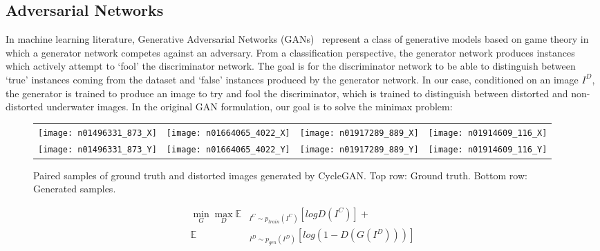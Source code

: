 \subsection{Adversarial Networks}
\label{sec:gans}
In machine learning literature, Generative Adversarial Networks 
(GANs)~\cite{goodfellow2014generative} represent a class of generative models based on game theory in which a generator network 
competes against an adversary. From a classification perspective, the generator network produces instances which actively attempt 
to `fool' the discriminator network. The goal is for the discriminator network to be able to distinguish between `true' 
instances coming from the dataset and `false' instances produced by the generator network.
In our case, conditioned on an image $I^D$, the generator is trained to produce an image to try and fool the 
discriminator, which is trained to distinguish between distorted and non-distorted underwater images. In the original
GAN formulation, our goal is to solve the minimax problem:

\begin{figure}
\centering
\begin{tabular}{p{1.7cm} p{1.7cm} p{1.7cm} p{1.7cm}}
   
   \texttt{[image: n01496331\_873\_X]} &
   \texttt{[image: n01664065\_4022\_X]} &
   \texttt{[image: n01917289\_889\_X]} &
   \texttt{[image: n01914609\_116\_X]} \\
   \texttt{[image: n01496331\_873\_Y]} &
   \texttt{[image: n01664065\_4022\_Y]} &
   \texttt{[image: n01917289\_889\_Y]} &
   \texttt{[image: n01914609\_116\_Y]} \\

\end{tabular}
\caption{Paired samples of ground truth and distorted images generated by CycleGAN. Top row: Ground truth.
Bottom row: Generated samples.}
\label{fig:cgan_samples}
\end{figure}


\begin{equation}
\begin{aligned}
   \min\limits_{G}\max\limits_{D} \mathbb{E} & _{I^C \sim p_{train}(I^C)} [logD(I^C)] + \\
   \mathbb{E} & _{I^D \sim p_{gen}(I^D)}[log(1 - D(G(I^D)))]
\end{aligned}
\end{equation}

